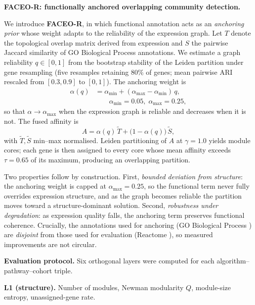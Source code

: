 \documentclass[twocolumn,10pt,letterpaper]{article}
\begin{document}
\noindent\textbf{FACEO-R: functionally anchored overlapping community detection.} \label{sec:faceor}

We introduce \textbf{FACEO-R}, in which functional annotation acts as an \emph{anchoring
prior} whose weight adapts to the reliability of the expression graph. Let $T$ denote the
topological overlap matrix derived from expression and $S$ the pairwise Jaccard similarity
of GO Biological Process annotations. We estimate a graph reliability $q\in[0,1]$ from the
bootstrap stability of the Leiden partition under gene resampling (five resamples retaining
80\% of genes; mean pairwise ARI rescaled from $[0.3,0.9]$ to $[0,1]$). The anchoring weight
is
\begin{equation}
\begin{split}
\alpha(q) &= \alpha_{\min} + (\alpha_{\max}-\alpha_{\min})\,q, \\
&\qquad \alpha_{\min}=0.05,\;\alpha_{\max}=0.25,
\end{split}
\end{equation}
so that $\alpha\to\alpha_{\max}$ when the expression graph is reliable and decreases when
it is not. The fused affinity is
\begin{equation}
A = \alpha(q)\,\tilde{T} + \bigl(1-\alpha(q)\bigr)\,\tilde{S},
\end{equation}
with $\tilde{T},\tilde{S}$ min--max normalised. Leiden partitioning of $A$ at
$\gamma=1.0$ yields module cores; each gene is then assigned to every core whose mean
affinity exceeds $\tau=0.65$ of its maximum, producing an overlapping partition.

Two properties follow by construction. First, \emph{bounded deviation from structure}: the
anchoring weight is capped at $\alpha_{\max}=0.25$, so the functional term never fully
overrides expression structure, and as the graph becomes reliable the partition moves toward a
structure-dominant solution. Second, \emph{robustness under degradation}: as expression quality falls, the
anchoring term preserves functional coherence. Crucially, the annotations used for anchoring
(GO Biological Process \citep{ashburner2000go}) are \emph{disjoint} from those used for
evaluation (Reactome \citep{jassal2020reactome}), so measured improvements are not circular.

\noindent\textbf{Evaluation protocol.} Six orthogonal layers were computed for each algorithm--pathway--cohort triple.

\noindent\textbf{L1 (structure).} Number of modules, Newman modularity $Q$, module-size
entropy, unassigned-gene rate.
\end{document}
